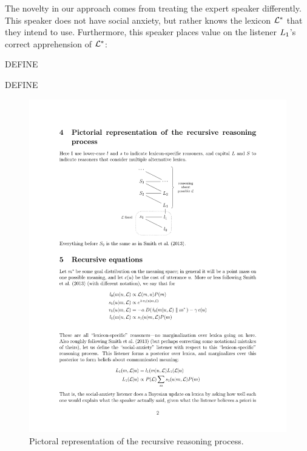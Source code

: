 The novelty in our approach comes from treating the expert speaker
differently. This speaker does not have social anxiety, but rather
knows the lexicon $\mathcal{L}^{\ast}$ that they intend to use. Furthermore,
this speaker places value on the listener $\ListenerOne$'s correct
apprehension of $\mathcal{L}^{\ast}$:

\begin{definition}[$\SpeakerK$]\label{def:s1}  
 DEFINE
\end{definition}

\begin{definition}[$\ListenerOne$]\label{def:l1}
  DEFINE
\end{definition}

\begin{figure}[htp]
  \centering
  \includegraphics[scale=1]{images/model}
  \caption{Pictoral representation of the recursive reasoning process.}
  \label{fig:model}
\end{figure}



